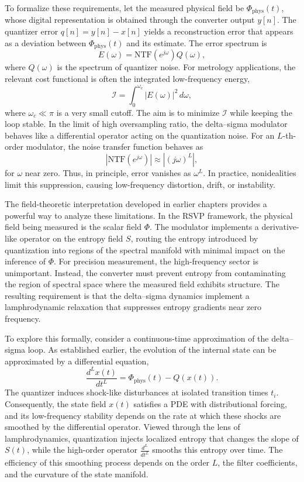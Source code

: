 To formalize these requirements, let the measured physical field be \( \Phi_{\mathrm{phys}}(t) \), whose digital representation is obtained through the converter output \( y[n] \). The quantizer error \( q[n] = y[n] - x[n] \) yields a reconstruction error that appears as a deviation between \( \Phi_{\mathrm{phys}}(t) \) and its estimate. The error spectrum is
\[
E(\omega) = \mathrm{NTF}(e^{j\omega}) Q(\omega),
\]
where \(Q(\omega)\) is the spectrum of quantizer noise. For metrology applications, the relevant cost functional is often the integrated low-frequency energy,
\[
\mathcal{I} = \int_{0}^{\omega_{c}} |E(\omega)|^{2} \, d\omega,
\]
where \( \omega_{c} \ll \pi \) is a very small cutoff. The aim is to minimize \(\mathcal{I}\) while keeping the loop stable. In the limit of high oversampling ratio, the delta–sigma modulator behaves like a differential operator acting on the quantization noise. For an \(L\)-th-order modulator, the noise transfer function behaves as
\[
|\mathrm{NTF}(e^{j\omega})| \approx |(j\omega)^{L}|,
\]
for \( \omega \) near zero. Thus, in principle, error vanishes as \( \omega^{L} \). In practice, nonidealities limit this suppression, causing low-frequency distortion, drift, or instability.

The field-theoretic interpretation developed in earlier chapters provides a powerful way to analyze these limitations. In the RSVP framework, the physical field being measured is the scalar field \( \Phi\). The modulator implements a derivative-like operator on the entropy field \(S\), routing the entropy introduced by quantization into regions of the spectral manifold with minimal impact on the inference of \(\Phi\). For precision measurement, the high-frequency sector is unimportant. Instead, the converter must prevent entropy from contaminating the region of spectral space where the measured field exhibits structure. The resulting requirement is that the delta–sigma dynamics implement a lamphrodynamic relaxation that suppresses entropy gradients near zero frequency.

To explore this formally, consider a continuous-time approximation of the delta–sigma loop. As established earlier, the evolution of the internal state can be approximated by a differential equation,
\[
\frac{d^{L} x(t)}{dt^{L}} = \Phi_{\mathrm{phys}}(t) - Q(x(t)).
\]
The quantizer induces shock-like disturbances at isolated transition times \( t_{i} \). Consequently, the state field \(x(t)\) satisfies a PDE with distributional forcing, and its low-frequency stability depends on the rate at which these shocks are smoothed by the differential operator. Viewed through the lens of lamphrodynamics, quantization injects localized entropy that changes the slope of \(S(t)\), while the high-order operator \(\frac{d^{L}}{dt^{L}}\) smooths this entropy over time. The efficiency of this smoothing process depends on the order \(L\), the filter coefficients, and the curvature of the state manifold.

